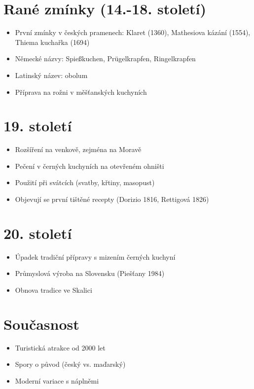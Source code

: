 \documentclass[a5paper,10pt]{book}
\begin{document}
\section{Rané zmínky (14.-18. století)}
\begin{itemize}
  \item První zmínky v českých pramenech: Klaret (1360), Mathesiova kázání (1554), Thiema kuchařka (1694)
  \item Německé názvy: Spießkuchen, Prügelkrapfen, Ringelkrapfen
  \item Latinský název: obolum
  \item Příprava na rožni v měšťanských kuchyních
\end{itemize}

\section{19. století}
\begin{itemize}
  \item Rozšíření na venkově, zejména na Moravě
  \item Pečení v černých kuchyních na otevřeném ohništi
  \item Použití při svátcích (svatby, křtiny, masopust)
  \item Objevují se první tištěné recepty (Dorizio 1816, Rettigová 1826)
\end{itemize}

\section{20. století}
\begin{itemize}
  \item Úpadek tradiční přípravy s mizením černých kuchyní
  \item Průmyslová výroba na Slovensku (Piešťany 1984)
  \item Obnova tradice ve Skalici
\end{itemize}

\section{Současnost}
\begin{itemize}
  \item Turistická atrakce od 2000 let
  \item Spory o původ (český vs. maďarský)
  \item Moderní variace s náplněmi
\end{itemize}
\end{document}
